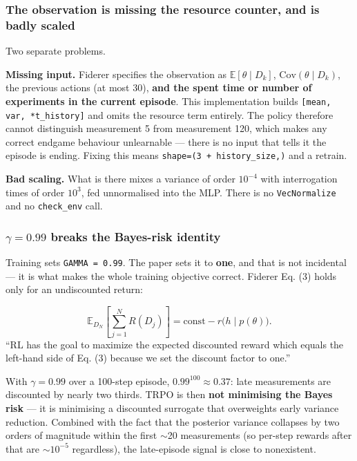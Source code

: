 \documentclass[12pt,a4paper]{article}
\begin{document}
\subsubsection{The observation is missing the resource counter, and is badly scaled}\label{sec:3-the-observation-is-missing-the-resource-counter-and-is-badly-scaled}
Two separate problems.

\textbf{Missing input.} Fiderer specifies the observation as $\mathbb{E}[\theta \mid D_k]$, $\mathrm{Cov}(\theta \mid D_k)$, the previous actions (at most 30), \textbf{and the spent time or number of experiments in the current episode}. This implementation builds \texttt{[mean, var, *t\_\allowbreak{}history]} and omits the resource term entirely. The policy therefore cannot distinguish measurement 5 from measurement 120, which makes any correct endgame behaviour unlearnable --- there is no input that tells it the episode is ending. Fixing this means \texttt{shape=(3 + history\_\allowbreak{}size,)} and a retrain.

\textbf{Bad scaling.} What is there mixes a variance of order $10^{-4}$ with interrogation times of order $10^3$, fed unnormalised into the MLP. There is no \texttt{VecNormalize} and no \texttt{check\_\allowbreak{}env} call.

\subsubsection{\texorpdfstring{$\gamma = 0.99$}{gamma = 0.99} breaks the Bayes-risk identity}\label{sec:4-gamma--099-breaks-the-bayes-risk-identity}
Training sets \texttt{GAMMA = 0.\allowbreak{}99}. The paper sets it to \textbf{one}, and that is not incidental --- it is what makes the whole training objective correct. Fiderer Eq. (3) holds only for an undiscounted return:

\begin{equation}
\mathbb{E}_{D_N}\left[\sum_{j=1}^{N} R(D_j)\right] = \mathrm{const} - r\bigl(h \mid p(\theta)\bigr).
\label{eq:undiscounted}
\end{equation}
``RL has the goal to maximize the expected discounted reward which equals the left-hand side of Eq. (3) because we set the discount factor to one.''

With $\gamma = 0.99$ over a 100-step episode, $0.99^{100} \approx 0.37$: late measurements are discounted by nearly two thirds. TRPO is then \textbf{not minimising the Bayes risk} --- it is minimising a discounted surrogate that overweights early variance reduction. Combined with the fact that the posterior variance collapses by two orders of magnitude within the first $\sim$20 measurements (so per-step rewards after that are $\sim 10^{-5}$ regardless), the late-episode signal is close to nonexistent.
\end{document}
